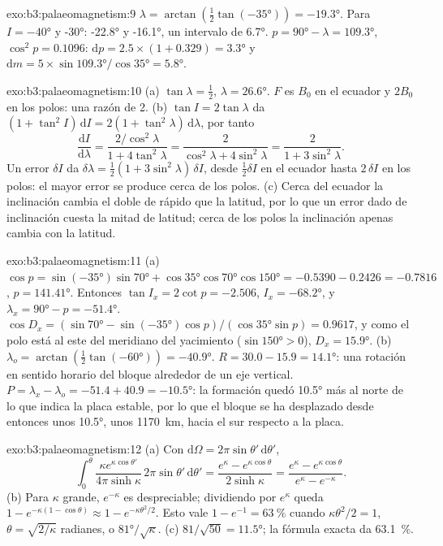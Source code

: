\begin{solution}{exo:b3:palaeomagnetism:9}
$\lambda = \arctan(\tfrac12\tan(\ang{-35})) = \ang{-19.3}$. Para $I = \ang{-40}$
y \ang{-30}: \ang{-22.8} y \ang{-16.1}, un intervalo de \ang{6.7}.
$p = \ang{90} - \lambda = \ang{109.3}$, $\cos^2p = 0.1096$:
$\mathrm dp = 2.5\times(1 + 0.329) = \ang{3.3}$ y $\mathrm dm =
5\times\sin\ang{109.3}/\cos\ang{35} = \ang{5.8}$.
\end{solution}

\begin{solution}{exo:b3:palaeomagnetism:10}
(a) $\tan\lambda = \tfrac12$, $\lambda = \ang{26.6}$. $F$ es $B_0$ en el
ecuador y $2B_0$ en los polos: una razón de 2. (b) $\tan I = 2\tan\lambda$
da $(1 + \tan^2I)\,\mathrm dI = 2(1 + \tan^2\lambda)\,\mathrm d\lambda$, por tanto
\[
  \frac{\mathrm dI}{\mathrm d\lambda} = \frac{2/\cos^2\lambda}{1 + 4\tan^2\lambda}
  = \frac{2}{\cos^2\lambda + 4\sin^2\lambda} = \frac{2}{1 + 3\sin^2\lambda}.
\]
Un error $\delta I$ da $\delta\lambda = \tfrac12(1 + 3\sin^2\lambda)\,\delta I$,
desde $\tfrac12\delta I$ en el ecuador hasta $2\,\delta I$ en los polos: el
mayor error se produce cerca de los polos. (c) Cerca del ecuador la inclinación cambia
el doble de rápido que la latitud, por lo que un error dado de inclinación cuesta la mitad
de latitud; cerca de los polos la inclinación apenas cambia con la latitud.
\end{solution}

\begin{solution}{exo:b3:palaeomagnetism:11}
(a) $\cos p = \sin(\ang{-35})\sin\ang{70} + \cos\ang{35}\cos\ang{70}\cos\ang{150}
= -0.5390 - 0.2426 = -0.7816$, $p = \ang{141.41}$. Entonces $\tan I_x = 2\cot p =
-2.506$, $I_x = \ang{-68.2}$, y $\lambda_x = \ang{90} - p = \ang{-51.4}$.
$\cos D_x = (\sin\ang{70} - \sin(\ang{-35})\cos p)/(\cos\ang{35}\sin p) =
0.9617$, y como el polo está al este del meridiano del yacimiento ($\sin\ang{150} >
0$), $D_x = \ang{15.9}$. (b) $\lambda_o = \arctan(\tfrac12\tan(\ang{-60})) =
\ang{-40.9}$. $R = 30.0 - 15.9 = \ang{14.1}$: una rotación en sentido horario del bloque
alrededor de un eje vertical. $P = \lambda_x - \lambda_o = -51.4 + 40.9 =
\ang{-10.5}$: la formación quedó \ang{10.5} más al norte de lo que indica la placa
estable, por lo que el bloque se ha desplazado desde entonces unos \ang{10.5}, unos
\qty{1170}{km}, hacia el sur respecto a la placa.
\end{solution}

\begin{solution}{exo:b3:palaeomagnetism:12}
(a) Con $\mathrm d\Omega = 2\pi\sin\theta'\,\mathrm d\theta'$,
\[
  \int_0^\theta\frac{\kappa e^{\kappa\cos\theta'}}{4\pi\sinh\kappa}\,2\pi\sin\theta'\,
  \mathrm d\theta' = \frac{e^\kappa - e^{\kappa\cos\theta}}{2\sinh\kappa}
  = \frac{e^\kappa - e^{\kappa\cos\theta}}{e^\kappa - e^{-\kappa}} .
\]
(b) Para $\kappa$ grande, $e^{-\kappa}$ es despreciable; dividiendo por $e^\kappa$
queda $1 - e^{-\kappa(1 - \cos\theta)} \approx 1 - e^{-\kappa\theta^2/2}$. Esto
vale $1 - e^{-1} = \qty{63}{\percent}$ cuando $\kappa\theta^2/2 = 1$, $\theta =
\sqrt{2/\kappa}$ radianes, o $\ang{81}/\sqrt\kappa$. (c) $81/\sqrt{50} =
\ang{11.5}$; la fórmula exacta da \qty{63.1}{\percent}.
\end{solution}

